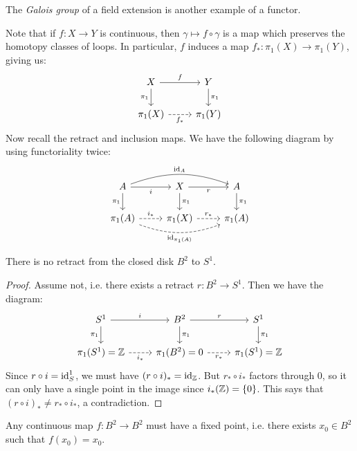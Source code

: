 \begin{remark}
  The \emph{Galois group} of a field extension is
  another example of a functor.
\end{remark}

\begin{example}
  Note that if $f : X \to Y$ is continuous, then
  $\gamma \mapsto f \circ \gamma$ is a map which
  preserves the homotopy classes of loops. In
  particular, $f$ induces a map $f_* : \pi_1(X) \to \pi_1(Y)$,
  giving us:
  \[
    \begin{tikzcd}
      X \ar[r, "f"] \ar[d, "\pi_1"'] & Y \ar[d, "\pi_1"] \\
      \pi_1(X) \ar[r, "f_*"', dashed] & \pi_1(Y)
    \end{tikzcd}
  \]
  Now recall the retract and inclusion maps.
  We have the following diagram by using
  functoriality twice:
  \[
    \begin{tikzcd}
      A \ar[r, "i", swap] \ar[rr, bend left=20, "\id_A"] \ar[d, "\pi_1"'] & X \ar[d, "\pi_1"] \ar[r, "r", swap] & A \ar[d, "\pi_1"] \\
      \pi_1(A) \ar[r, "i_*"', dashed, swap] \ar[rr, bend right=20, "\id_{\pi_1(A)}", dashed, swap] & \pi_1(X) \ar[r, "r_*", dashed] & \pi_1(A)
    \end{tikzcd}
  \]
\end{example}

\begin{theorem}[No retract]
  There is no retract from the closed disk
  $B^2$ to $S^1$.
\end{theorem}

\begin{proof}
  Assume not, i.e. there exists a retract $r : B^2 \to S^1$.
  Then we have the diagram:
  \[
    \begin{tikzcd}
      S^1 \ar[r, "i"] \ar[d, "\pi_1"'] & B^2 \ar[d, "\pi_1"] \ar[r, "r"] & S^1 \ar[d, "\pi_1"] \\
      \pi_1(S^1) = \Z \ar[r, "i_*"', dashed] & \pi_1(B^2) = 0 \ar[r, "r_*", swap, dashed] & \pi_1(S^1) = \Z
    \end{tikzcd}
  \]
  Since $r \circ i = \operatorname{id}_S^1$, we must
  have $(r \circ i)_* = \operatorname{id}_{\mathbb{Z}}$. But
  $r_* \circ i_*$ factors through $0$, so it can
  only have a single point in
  the image since $i_*(\mathbb{Z}) = \{0\}$. This
  says that $(r \circ i)_* \ne r_* \circ i_*$,
  a contradiction.
\end{proof}

\begin{theorem}
  Any continuous map $f : B^2 \to B^2$ must
  have a fixed point, i.e. there exists $x_0 \in B^2$
  such that $f(x_0) = x_0$.
\end{theorem}

